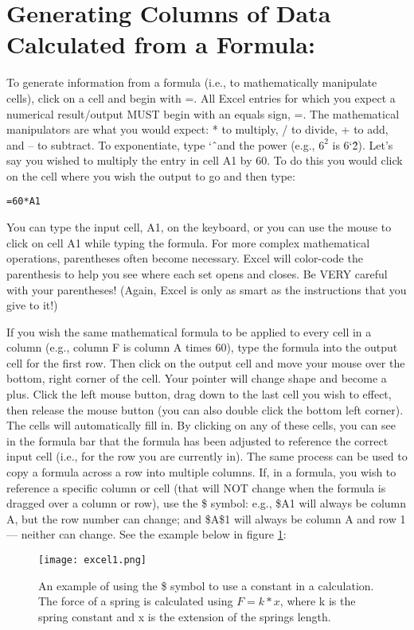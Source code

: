 \section*{Generating Columns of Data Calculated from a Formula:}
To generate information from a formula (i.e., to mathematically manipulate cells), click on a cell and begin with =. 
All Excel entries for which you expect a numerical result/output MUST begin with an equals sign, =. 
The mathematical manipulators are what you would expect: * to multiply, / to divide, + to add, and – to subtract. 
To exponentiate, type \char`\^ \ and the power (e.g., $6^{2}$ is 6\char`\^2). 
Let's say you wished to multiply the entry in cell A1 by 60. 
To do this you would click on the cell where you wish the output to go and then type:

\medskip
\texttt{=60*A1}
\medskip

You can type the input cell, A1, on the keyboard, or you can use the mouse to click on cell A1 while typing the formula. 
For more complex mathematical operations, parentheses often become necessary. 
Excel will color-code the parenthesis to help you see where each set opens and closes. 
Be VERY careful with your parentheses!
(Again, Excel is only as smart as the instructions that you give to it!)
\par 
If you wish the same mathematical formula to be applied to every cell in a column (e.g., column F is column A times 60), type the formula into the output cell for the first row. 
Then click on the output cell and move your mouse over the bottom, right corner of the cell. 
Your pointer will change shape and become a plus. 
Click the left mouse button, drag down to the last cell you wish to effect, then release the mouse button (you can also double click the bottom left corner). 
The cells will automatically fill in. 
By clicking on any of these cells, you can see in the formula bar that the formula has been adjusted to reference the correct input cell (i.e., for the row you are currently in). 
The same process can be used to copy a formula across a row into multiple columns. 
If, in a formula, you wish to reference a specific column or cell (that will NOT change when the formula is dragged over a column or row), use the \$ symbol: e.g., \$A1 will always be column A, but the row number can change; and \$A\$1 will always be column A and row 1 — neither can change. See the example below in figure \ref{fig:exc1}:

\begin{figure}[h]
\texttt{[image: excel1.png]}
\centering
\caption{An example of using the \$ symbol to use a constant in a calculation. The force of a spring is calculated using $F=k * x$, where k is the spring constant and x is the extension of the springs length.}
\label{fig:exc1}
\end{figure}

